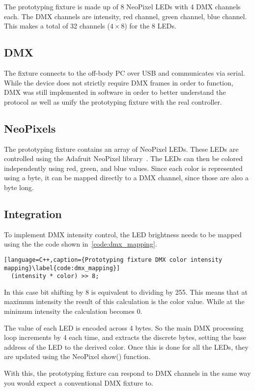 The prototyping fixture is made up of 8 NeoPixel LEDs with 4 DMX channels each.
The DMX channels are intensity, red channel, green channel, blue channel.
This makes a total of 32 channels (\(4 \times 8\)) for the 8 LEDs.

\subsection{DMX}
The fixture connects to the off-body PC over USB and communicates via serial.
While the device does not strictly require DMX frames in order to function,
DMX was still implemented in software in order to better understand the protocol as well as unify the prototyping fixture with the real controller.

\subsection{NeoPixels}
The prototyping fixture contains an array of NeoPixel LEDs.
These LEDs are controlled using the Adafruit NeoPixel library~\cite{NeoPixel}.
The LEDs can then be colored independently using red, green, and blue values.
Since each color is represented using a byte, it can be mapped directly to a DMX channel, since those are also a byte long.

\subsection{Integration}
To implement DMX intensity control, the LED brightness needs to be mapped using the the code shown in~\autoref{code:dmx_mapping}.

\begin{lstlisting}[language=C++,caption={Prototyping fixture DMX color intensity mapping}\label{code:dmx_mapping}]
  (intensity * color) >> 8;
\end{lstlisting}

In this case bit shifting by 8 is equivalent to dividing by 255.
This means that at maximum intensity the result of this calculation is the color value.
While at the minimum intensity the calculation becomes 0.

The value of each LED is encoded across 4 bytes.
So the main DMX processing loop increments by 4 each time,
and extracts the discrete bytes, setting the base address of the LED to the derived color.
Once this is done for all the LEDs, they are updated using the NeoPixel show() function.

With this, the prototyping fixture can respond to DMX channels in the same way you would expect a conventional DMX fixture to.

